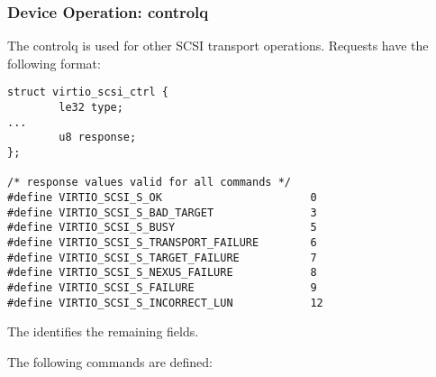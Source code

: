 \subsubsection{Device Operation: controlq}\label{sec:Device Types / SCSI Host Device / Device Operation / Device Operation: controlq}

The controlq is used for other SCSI transport operations.
Requests have the following format:

\begin{lstlisting}
struct virtio_scsi_ctrl {
        le32 type;
...
        u8 response;
};

/* response values valid for all commands */
#define VIRTIO_SCSI_S_OK                       0
#define VIRTIO_SCSI_S_BAD_TARGET               3
#define VIRTIO_SCSI_S_BUSY                     5
#define VIRTIO_SCSI_S_TRANSPORT_FAILURE        6
#define VIRTIO_SCSI_S_TARGET_FAILURE           7
#define VIRTIO_SCSI_S_NEXUS_FAILURE            8
#define VIRTIO_SCSI_S_FAILURE                  9
#define VIRTIO_SCSI_S_INCORRECT_LUN            12
\end{lstlisting}

The  identifies the remaining fields.

The following commands are defined:

